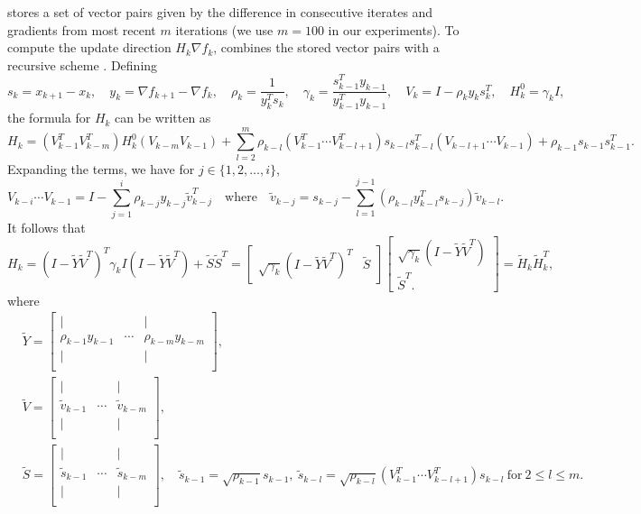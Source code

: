 \lbfgs{} stores a set of vector pairs given by the difference in consecutive iterates and gradients from most recent $m$ iterations (we use $m = 100$ in our experiments).
To compute the update direction $H_k \nabla f_k$, \lbfgs{} combines the stored vector pairs with a recursive scheme \cite{nocedal2006numerical}.
Defining
\[
    s_{k} = x_{k+1} - x_{k}, 
    \quad y_k = \nabla f_{k+1} - \nabla f_{k}, 
    \quad \rho_{k} = \frac{1}{y_{k}^{T}s_{k}}, 
    \quad \gamma_{k} = \frac{s_{k-1}^{T}y_{k-1}}{y_{k-1}^{T}y_{k-1}}, 
    \quad V_k = I - \rho_{k} y_{k} s_{k}^{T}, 
    \quad H_k^{0} = \gamma_{k} I,
\]
the formula for $H_k$ can be written as
\[
    H_{k} 
    = (V_{k-1}^{T} V_{k-m}^{T}) H_{k}^{0} (V_{k-m} V_{k-1}) 
    + \sum_{l=2}^{m} \rho_{k-l} (V_{k-1}^{T} \cdots V_{k-l+1}^{T}) s_{k-l} s_{k-l}^{T} (V_{k-l+1} \cdots V_{k-1})
    + \rho_{k-1} s_{k-1} s_{k-1}^{T}.
\]
Expanding the terms, we have for $j \in \{1, 2, \ldots, i\}$,
\[
    V_{k-i} \cdots V_{k-1} = I - \sum_{j=1}^{i} \rho_{k-j} y_{k-j} \tilde{v}_{k-j}^{T}
    \quad \text{where} \quad \tilde{v}_{k-j} = s_{k-j} - \sum_{l=1}^{j-1} (\rho_{k-l} y_{k-l}^{T} s_{k-j}) \tilde{v}_{k-l}.
\]
It follows that
\[
    H_{k} 
    = (I - \tilde{Y}\tilde{V}^{T})^{T} \gamma_{k} I (I - \tilde{Y}\tilde{V}^{T}) + \tilde{S} \tilde{S}^{T}
    = 
    \begin{bmatrix*}
        \sqrt{\gamma_k} (I - \tilde{Y}\tilde{V}^{T})^{T} & \tilde{S}
    \end{bmatrix*}
    \begin{bmatrix*}
        \sqrt{\gamma_k} (I - \tilde{Y}\tilde{V}^{T}) \\ 
        \tilde{S}^{T}.
    \end{bmatrix*}
    = \tilde{H}_k \tilde{H}_k^{T},
\]
where
\[
\begin{aligned}
    & \tilde{Y} = 
    \begin{bmatrix*} 
        \vert & & \vert \\
        \rho_{k-1} y_{k-1} & \cdots & \rho_{k-m} y_{k-m} \\
        \vert & & \vert \\
    \end{bmatrix*}, \\
    & \tilde{V} = 
    \begin{bmatrix*} 
        \vert & & \vert \\
        \tilde{v}_{k-1} & \cdots & \tilde{v}_{k-m} \\
        \vert & & \vert \\
    \end{bmatrix*}, \\
    & \tilde{S} = 
    \begin{bmatrix*} 
        \vert & & \vert \\
        \tilde{s}_{k-1} & \cdots & \tilde{s}_{k-m} \\
        \vert & & \vert \\
    \end{bmatrix*},
    \quad \tilde{s}_{k-1} = \sqrt{\rho_{k-1}} s_{k-1}, 
    ~ \tilde{s}_{k-l} = \sqrt{\rho_{k-l}} (V_{k-1}^{T} \cdots V_{k-l+1}^{T}) s_{k-l} ~ \text{for} ~ 2 \leq l \leq m.
\end{aligned}
\]

